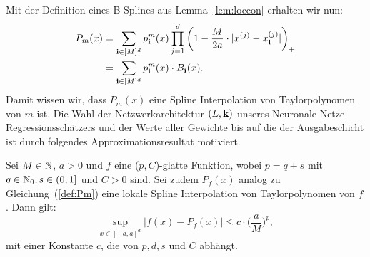 Mit der Definition eines B-Splines aus Lemma~\ref{lem:loccon} erhalten wir nun:
\begin{equation}
\label{def:Pm}
\begin{split}
P_m(x) &= \sum_{\mathbf{i} \in [M]^d} p_{\mathbf{i}}^m(x) \prod_{j = 1}^{d} \bigg(1 - \frac{M}{2a} \cdot |x^{(j)} - x_{\mathbf{i}}^{(j)}|\bigg)_+ \\
& = \sum_{\mathbf{i} \in [M]^d} p_{\mathbf{i}}^m(x) \cdot B_{\mathbf{i}}(x).
\end{split}
\end{equation}
Damit wissen wir, dass $P_m(x)$ eine Spline Interpolation von Taylorpolynomen von $m$ ist.
Die Wahl der Netzwerkarchitektur $(L,\mathbf{k})$ unseres Neuronale-Netze-Regressionsschätzers und der Werte aller Gewichte bis auf die der Ausgabeschicht ist durch folgendes Approximationsresultat motiviert.
\begin{lem}
\label{lem:pcsmooth}
Sei $M \in \mathbb{N}$, $a > 0$ und $f$ eine ($p, C$)-glatte Funktion, wobei $p = q + s$ mit $q \in \mathbb{N}_0, s \in (0,1]$ und $C > 0$ sind. Sei zudem $P_f(x)$ analog zu Gleichung~(\ref{def:Pm}) eine lokale Spline Interpolation von Taylorpolynomen von $f$. Dann gilt:
$$\sup_{x \in [-a, a]^d} |f(x) - P_f(x)|  \leq c \cdot \bigg(\frac{a}{M}\bigg)^p,$$
mit einer Konstante $c$, die von $p, d, s$ und $C$ abhängt.
\end{lem}
